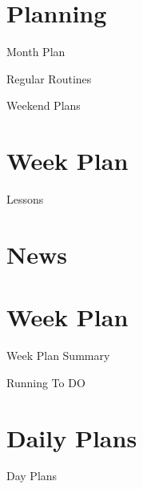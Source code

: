 \documentclass[]{beamer}
\begin{document}
\section{Planning}
\begin{frame}{Month Plan}

\end{frame}
\begin{frame}{Regular Routines}

\end{frame}
\begin{frame}{Weekend Plans}

\end{frame}

\section{Week Plan}
 
\begin{frame}{Lessons} 
\end{frame}
\section{News}

%

\section{Week Plan}
\begin{markdown}
\begin{frame}{Week Plan Summary}
\end{frame}
\end{markdown}

\begin{markdown}
\begin{frame}[allowframebreaks]{Running To DO}
\end{frame}
\end{markdown}

\section{Daily Plans}
\begin{markdown} 
\begin{frame}{Day Plans}
\end{frame}
\end{markdown}
\end{document}
